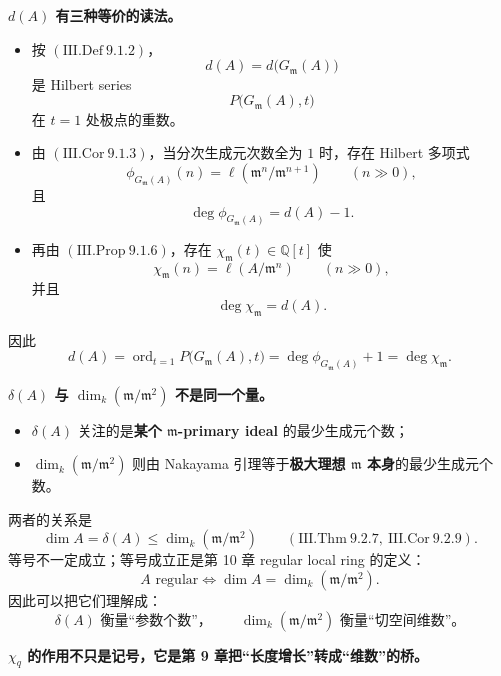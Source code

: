 \documentclass[a4paper]{ctexart}
\theoremstyle{definition}
\theoremstyle{analysis}
\theoremstyle{plain}
\begin{document}
\medskip

\textbf{\(d(A)\) 有三种等价的读法。}
\begin{itemize}
  \item 按 \((\mathrm{III.Def}\ 9.1.2)\)，
  \[
    d(A)=d\!\bigl(G_{\mathfrak m}(A)\bigr)
  \]
  是 Hilbert series
  \[
    P\bigl(G_{\mathfrak m}(A),t\bigr)
  \]
  在 \(t=1\) 处极点的重数。
  \item 由 \((\mathrm{III.Cor}\ 9.1.3)\)，当分次生成元次数全为 \(1\) 时，存在 Hilbert 多项式
  \[
    \phi_{G_{\mathfrak m}(A)}(n)=\ell(\mathfrak m^n/\mathfrak m^{n+1})
    \qquad (n\gg 0),
  \]
  且
  \[
    \deg \phi_{G_{\mathfrak m}(A)}=d(A)-1.
  \]
  \item 再由 \((\mathrm{III.Prop}\ 9.1.6)\)，存在 \(\chi_{\mathfrak m}(t)\in \mathbb Q[t]\) 使
  \[
    \chi_{\mathfrak m}(n)=\ell(A/\mathfrak m^n)
    \qquad (n\gg 0),
  \]
  并且
  \[
    \deg \chi_{\mathfrak m}=d(A).
  \]
\end{itemize}
因此
\[
  d(A)
  =
  \operatorname{ord}_{t=1} P\bigl(G_{\mathfrak m}(A),t\bigr)
  =
  \deg \phi_{G_{\mathfrak m}(A)}+1
  =
  \deg \chi_{\mathfrak m}.
\]

\medskip

\textbf{\(\delta(A)\) 与 \(\dim_k(\mathfrak m/\mathfrak m^2)\) 不是同一个量。}
\begin{itemize}
  \item \(\delta(A)\) 关注的是\textbf{某个 \(\mathfrak m\)-primary ideal} 的最少生成元个数；
  \item \(\dim_k(\mathfrak m/\mathfrak m^2)\) 则由 Nakayama 引理等于\textbf{极大理想 \(\mathfrak m\) 本身}的最少生成元个数。
\end{itemize}
两者的关系是
\[
  \dim A=\delta(A)\le \dim_k(\mathfrak m/\mathfrak m^2)
  \qquad
  (\mathrm{III.Thm}\ 9.2.7,\ \mathrm{III.Cor}\ 9.2.9).
\]
等号不一定成立；等号成立正是第 10 章 regular local ring 的定义：
\[
  A\text{ regular}
  \iff
  \dim A=\dim_k(\mathfrak m/\mathfrak m^2).
\]
因此可以把它们理解成：
\[
  \delta(A)\text{ 衡量“参数个数”，}\qquad
  \dim_k(\mathfrak m/\mathfrak m^2)\text{ 衡量“切空间维数”。}
\]

\medskip

\textbf{\(\chi_q\) 的作用不只是记号，它是第 9 章把“长度增长”转成“维数”的桥。}
\end{document}
